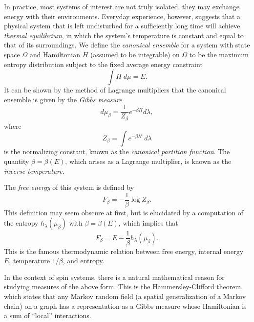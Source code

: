 In practice, most systems of interest are not truly isolated: they may exchange
energy with their environments. Everyday experience, however, suggests that
a physical system that is left undisturbed for a sufficiently long time will achieve \emph{thermal equilibrium}, in which the system's temperature is constant and equal to that of its surroundings. We define the \emph{canonical ensemble} for a system with state space $\Omega$ and Hamiltonian $H$
(assumed to be integrable) on
$\Omega$ to be the maximum entropy distribution subject to the fixed average energy constraint
\begin{equation}
\int H \; d\mu = E.
\end{equation}
It can be shown by the method of Lagrange multipliers that the canonical ensemble is given by the \emph{Gibbs measure}
\begin{equation}
d\mu_\beta = \frac{1}{Z_\beta} e^{-\beta H} d\lambda,
\end{equation}
where
\begin{equation}
Z_\beta = \int e^{-\beta H} \; d\lambda
\end{equation}
is the normalizing constant, known as the \emph{canonical partition function}.
The quantity $\beta = \beta(E)$, which arises as a Lagrange multiplier, is known as the \emph{inverse temperature}.

The \emph{free energy} of this system is defined by
\begin{equation}
F_\beta = -\frac{1}{\beta} \log Z_\beta.
\end{equation}
This definition may seem obscure at first, but is elucidated by a computation of the entropy $h_\lambda(\mu_\beta)$ with $\beta = \beta(E)$, which implies that
\begin{equation}
F_\beta = E - \frac{1}{\beta} h_\lambda(\mu_\beta).
\end{equation}
This is the famous thermodynamic relation between free energy, internal energy $E$, temperature $1/\beta$, and entropy.


In the context of spin systems, there is a natural mathematical reason for studying measures of the above form. This is the Hammersley-Clifford theorem, which states that any Markov random field (a spatial generalization of a Markov chain) on a graph has a representation as a Gibbs measure whose Hamiltonian is a sum of ``local'' interactions.


